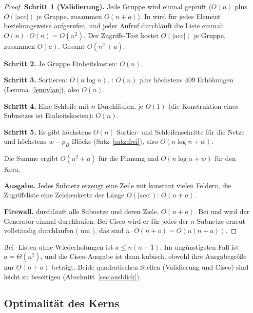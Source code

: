 \begin{proof}
	\textbf{Schritt 1 (Validierung).} Jede Gruppe wird einmal geprüft ($O(n)$ plus $O(|\text{acc}|)$ je Gruppe, zusammen $O(n + a)$). In  wird für jedes Element  beziehungsweise  aufgerufen, und jeder Aufruf durchläuft die Liste einmal: $O(n)\cdot O(n) = O(n^2)$. Der Zugriffs-Test  kostet $O(|\text{acc}|)$ je Gruppe, zusammen $O(a)$. Gesamt $O(n^2 + a)$.

	\textbf{Schritt 2.} Je Gruppe Einheitskosten: $O(n)$.

	\textbf{Schritt 3.} Sortieren: $O(n\log n)$. : $O(n)$ plus höchstens $409$ Erhöhungen (Lemma~\ref{lem:vlan}), also $O(n)$.

	\textbf{Schritt 4.} Eine Schleife mit $n$ Durchläufen, je $O(1)$ (die Konstruktion eines Subnetzes ist Einheitskosten): $O(n)$.

	\textbf{Schritt 5.} Es gibt höchstens $O(n)$ Sortier- und Schleifenschritte für die Netze und höchstens $w - p_B$ Blöcke (Satz~\ref{satz:frei}), also $O(n\log n + w)$.

	Die Summe ergibt $O(n^2 + a)$ für die Planung und $O(n\log n + w)$ für den Kern.

	\textbf{Ausgabe.} Jedes Subnetz erzeugt eine Zeile mit konstant vielen Feldern, die Zugriffsliste eine Zeichenkette der Länge $O(|\text{acc}|)$: $O(n + a)$.

	\textbf{Firewall.}  durchläuft alle Subnetze und deren Ziele, $O(n + a)$. Bei  und  wird der Generator einmal durchlaufen. Bei Cisco wird er für jedes der $n$ Subnetze erneut vollständig durchlaufen ( um ), das sind $n\cdot O(n+a) = O(n(n+a))$.
\end{proof}

\begin{bemerkung}
	Bei -Listen ohne Wiederholungen ist $a \le n(n-1)$. Im ungünstigsten Fall ist $a = \Theta(n^2)$, und die Cisco-Ausgabe ist dann kubisch, obwohl ihre Ausgabegröße nur $\Theta(n + a)$ beträgt. Beide quadratischen Stellen (Validierung und Cisco) sind leicht zu beseitigen (Abschnitt~\ref{sec:ausblick}).
\end{bemerkung}

\subsection{Optimalität des Kerns}

